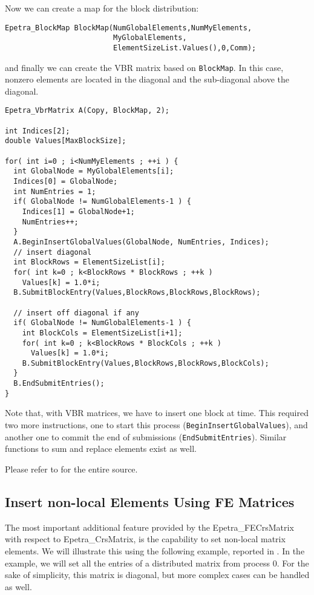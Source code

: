 Now we can create a map for the block distribution:
\begin{verbatim}
Epetra_BlockMap BlockMap(NumGlobalElements,NumMyElements,
                         MyGlobalElements, 
                         ElementSizeList.Values(),0,Comm);
\end{verbatim}
and finally we can create the VBR matrix based on \verb!BlockMap!. In
this case, nonzero elements are located in the diagonal and the
sub-diagonal above the diagonal.
\begin{verbatim}
Epetra_VbrMatrix A(Copy, BlockMap, 2);

int Indices[2];
double Values[MaxBlockSize];

for( int i=0 ; i<NumMyElements ; ++i ) {
  int GlobalNode = MyGlobalElements[i];
  Indices[0] = GlobalNode;
  int NumEntries = 1;
  if( GlobalNode != NumGlobalElements-1 ) {
    Indices[1] = GlobalNode+1;
    NumEntries++;
  }
  A.BeginInsertGlobalValues(GlobalNode, NumEntries, Indices);
  // insert diagonal
  int BlockRows = ElementSizeList[i];
  for( int k=0 ; k<BlockRows * BlockRows ; ++k )
    Values[k] = 1.0*i;
  B.SubmitBlockEntry(Values,BlockRows,BlockRows,BlockRows);

  // insert off diagonal if any
  if( GlobalNode != NumGlobalElements-1 ) {
    int BlockCols = ElementSizeList[i+1];
    for( int k=0 ; k<BlockRows * BlockCols ; ++k )
      Values[k] = 1.0*i;
    B.SubmitBlockEntry(Values,BlockRows,BlockRows,BlockCols);
  }
  B.EndSubmitEntries();
}
\end{verbatim}
Note that, with VBR matrices, we have to insert one block at time.  This
required two more instructions, one to start this process
(\verb!BeginInsertGlobalValues!), and another one to commit the end of
submissions (\verb!EndSubmitEntries!). Similar functions to sum and
replace elements exist as well.
 
\smallskip

Please refer to  for the entire source.


\subsection{Insert non-local Elements Using FE Matrices}
\label{sec:fematrix}

The most important additional feature provided by the
Epetra\_FECrsMatrix with respect to Epetra\_CrsMatrix, is the capability
to set non-local matrix elements. We will illustrate this using the
following example, reported in \newline {}. In the
example, we will set all the entries of a distributed matrix from
process 0. For the sake of simplicity, this matrix is diagonal, but more
complex cases can be handled as well.


